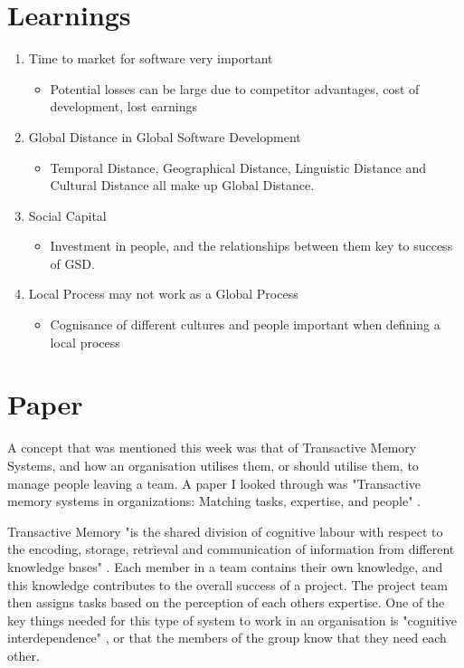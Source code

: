 \section{Learnings}
\begin{enumerate}
\item Time to market for software very important
\begin{itemize}
\item Potential losses can be large due to competitor advantages, cost of development, lost earnings
\end{itemize}
\item Global Distance in Global Software Development
\begin{itemize}
\item Temporal Distance, Geographical Distance, Linguistic Distance and Cultural Distance all make up Global Distance. 
\end{itemize}
\item Social Capital
\begin{itemize}
\item Investment in people, and the relationships between them key to success of GSD. 
\end{itemize}
\item Local Process may not work as a Global Process
\begin{itemize}
\item Cognisance of different cultures and people important when defining a local process
\end{itemize}
\end{enumerate}

\section{Paper}

A concept that was mentioned this week was that of Transactive Memory Systems, and how an organisation utilises them, or should utilise them, to manage people leaving a team. A paper I looked through was "Transactive memory systems in organizations: Matching tasks, expertise, and people" \parencite{week11}. 

Transactive Memory "is the shared division of cognitive labour with respect to the encoding, storage, retrieval and communication of information from different knowledge bases" \parencite{week11}. Each member in a team contains their own knowledge, and this knowledge contributes to the overall success of a project. The project team then assigns tasks based on the perception of each others expertise. One of the key things needed for this type of system to work in an organisation is "cognitive interdependence" \parencite{week11}, or that the members of the group know that they need each other.

